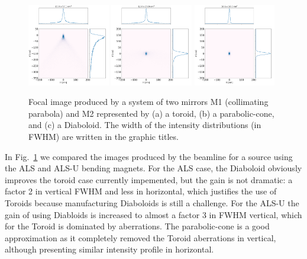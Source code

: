 \documentclass[a4paper, 11pt]{article}
\begin{document}
\begin{figure}[h]
\includegraphics[width=0.32\textwidth]{figures/alsu_toroid.png}
\includegraphics[width=0.32\textwidth]{figures/alsu_parabolic-cone.png}
\includegraphics[width=0.32\textwidth]{figures/alsu_diaboloid.png}
\caption{\label{fig:als}Focal image produced by a system of two mirrors M1 (collimating parabola) and M2 represented by (a) a toroid, (b) a parabolic-cone, and (c) a Diaboloid. The width of the intensity distributions (in FWHM) are written in the graphic titles. 
}
\end{figure}

In Fig.~\ref{fig:als} we compared the images produced by the beamline for a source using the ALS and ALS-U bending magnets. For the ALS case, the Diaboloid obviously improves the toroid case currently impemented, but the gain is not dramatic: a factor 2 in vertical FWHM and less in horizontal, which justifies the use of Toroids because manufacturing Diaboloids is still a challenge. For the ALS-U the gain of using Diabloids is increased to almost a factor 3 in FWHM vertical, which for the Toroid is dominated by aberrations. The parabolic-cone is a good approximation as it completely removed the Toroid aberrations in vertical, although presenting similar intensity profile in horizontal.
\end{document}
